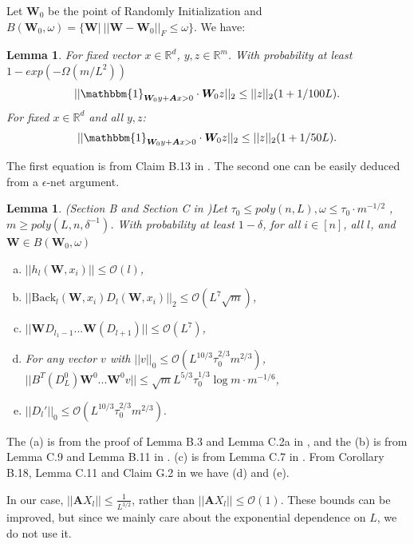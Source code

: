 \documentclass{article}
\newcommand{\cO}{\mathcal{O}}
\newtheorem{lem}[theo]{\textbf{Lemma}}
\begin{document}
Let $\bm{W}_0$ be the point of Randomly Initialization and $B(\bm{W}_0,\omega)=\{\bm{W}|\ ||\bm{W}-\bm{W}_0||_F\leq \omega\}$. We have:
\begin{lem}\label{bt}
For fixed vector $x\in \mathbb{R}^d$, $y, z\in \mathbb{R}^m$. With probability at least $1-exp(-\Omega(m/L^2))$
\begin{equation}
||\mathbbm{1}_{\bm{W}_0y+\bm{A}x>0} \cdot \bm{W}_0z||_2\leq ||z||_2(1+1/100L).
\end{equation}
For fixed $x\in \mathbb{R}^d$ and all $y,z$:
\begin{equation}
||\mathbbm{1}_{\bm{W}_0y+\bm{A}x>0} \cdot \bm{W}_0z||_2\leq ||z||_2(1+1/50L).
\end{equation}
\end{lem}
The first equation is from Claim B.13 in \cite{rate}. The second one can be easily deduced from a $\epsilon$-net argument.


\begin{lem}(Section B and Section C in \cite{rate})\label{elem}
Let $ \tau_0\leq poly(n,L), \omega\leq  \tau_0\cdot m^{-1/2}$ , $m\geq poly(L,n,\delta^{-1})$. With probability at least $1-\delta$, for all $i\in [n]$, all $l$, and $\bm{W} \in B(\bm{W}_0,\omega)$
\begin{enumerate}[(a)]
\item $||h_l(\bm{W},x_i)||\leq \cO(l)$,
\item $||\text{Back}_l(\bm{W}, x_i)D_l(\bm{W}, x_i)||_2\leq \cO(L^7\sqrt{m})$,
\item $||\bm{W}D_{l_1-1}...\bm{W}(D_{l+1})||\leq \cO(L^7)$,
\item For any vector $v$ with $||v||_0\leq\cO(L^{10/3}\tau_0^{2/3}m^{2/3})$, $||B^T(D^0_L)\bm{W}^0...\bm{W}^0v|| \leq  \sqrt{m}L^{5/3}\tau_0^{1/3}\log m\cdot m^{-1/6} $,
\item $ ||D_l'||_0\leq  \cO(L^{10/3}\tau_0^{2/3}m^{2/3}).$
\end{enumerate}
\end{lem}
The (a) is from the proof of Lemma B.3 and Lemma C.2a in \cite{rate}, and the (b) is from Lemma C.9 and Lemma B.11  in \cite{rate}. (c) is from Lemma C.7 in \cite{rate}. From Corollary B.18, Lemma C.11 and Claim G.2 in \cite{rate} we have (d) and (e).

In our case, $||\bm{A}X_l||\leq \frac{1}{L^{3/2}}$, rather than  $||\bm{A}X_l||\leq \cO(1)$. These bounds can be improved, but since we mainly care about the exponential dependence on $L$, we do not use it.
\end{document}
